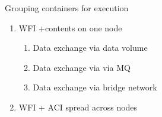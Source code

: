 Grouping containers for execution
\begin{enumerate}[nosep]
  \item WFI +contents on one node
    \begin{enumerate}[nosep]
      \item Data exchange via data volume
      \item Data exchange via via MQ
      \item Data exchange via bridge network
    \end{enumerate}
  \item WFI + ACI spread across nodes
\end{enumerate}
